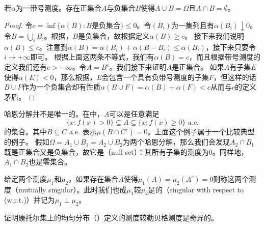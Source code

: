 \documentclass[main.tex]{subfiles}
\begin{document}
\begin{theorem}
	\label{thm:a.4.5}
	若\(\alpha\)为一带号测度。存在正集合\(A\)与负集合\(B\)使得\(A\cup B=\Omega\)且\(A\cap B = \emptyset\)。
\end{theorem}
\begin{proof}
	令\(c=\inf\{\alpha(B): B\text{是负集合}\}\leq 0\)。令\((B_i)\)为一集列且有\(\alpha(B_i) \downarrow 0\)。令\(B = \bigcup_i B_i\)。根据，\(B\)是负集合，故根据定义\(\alpha(B) \geq c\)。
	接下来我们说明\(\alpha(B)\leq c\)。注意到\(\alpha(B) = \alpha(B_i)+\alpha(B-B_i) \leq \alpha(B_i)\)，接下来只要令\(i\rightarrow +\infty\)即可。
	根据上面这两条不等式，我们有\(\alpha(B)=c\)，而且根据带号测度的定义我们还有\(c>-\infty\)。令\(A=B^c\)。我们接下来证明\(A\)是正集合。
	如果\(A\)有子集\(E\)使得\(\alpha(E)<0\)，那么根据，\(E\)会包含一个具有负带号测度的子集\(F\)，但这样的话\(B\cup F\)作为一个负集合却有性质\(\alpha(B\cup F) = \alpha(B)+\alpha(F) < c\)从而与\(c\)的定义矛盾。
\end{proof}

哈恩分解并不是唯一的。在中，\(A\)可以是任意满足
\[\{x: f(x)>0\}\subseteq A\subseteq \{x: f(x)\geq 0\} \text{ a.e.}\]
的集合。其中\(B\subseteq C\) a.e. 表示\(\mu(B\cap C^c)=0\)。上面这个例子属于一个比较典型的例子。
假如\(\Omega = A_1\cup B_1=A_2\cup B_2\)为两个哈恩分解，那么我们会发现\(A_2\cap B_1\)既是正集合又是负集合，故它是（null set）：其所有子集的测度为\(0\)。同样地，\(A_1\cap B_2\)也是零集合。

给定两个测度\(\mu_1\)和\(\mu_2\)，如果存在集合\(A\)使得\(\mu_1(A)=\mu_2(A^c)=0\)则称这两个测度（mutually singular）。此时我们也成\(\mu_1\)较\(\mu_2\)是的（singular with respect to (w.r.t.)）并记为\(\mu_1\perp\mu_2\)。
\begin{exercise}[start=2]
	\item 证明康托尔集上的均匀分布（）定义的测度较勒贝格测度是奇异的。
\end{exercise}
\end{document}
